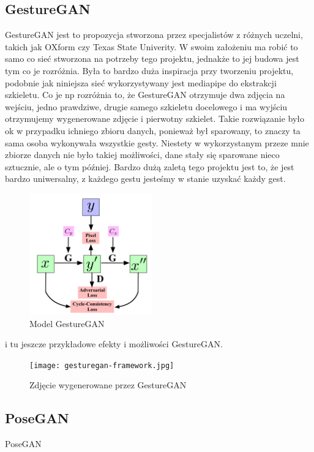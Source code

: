 \documentclass[12pt]{article}
\begin{document}
\begin{sloppypar}
{  \subsection{GestureGAN}
  {
    GestureGAN\cite{gesture-gan} jest to propozycja stworzona przez specjalistów z różnych uczelni, takich jak OXform czy Texas State Univerity.
    W swoim założeniu ma robić to samo co sieć stworzona na potrzeby tego projektu, jednakże to jej budowa jest tym co je rozróżnia.
    Była to bardzo duża inspiracja przy tworzeniu projektu, podobnie jak niniejsza sieć wykorzystywany jest mediapipe do ekstrakcji szkieletu. 
    Co je np rozróżnia to, że GestureGAN otrzymuje dwa zdjęcia na wejściu, jedno prawdziwe, drugie samego szkieletu docelowego i ma wyjściu otrzymujemy wygenerowane zdjęcie i pierwotny szkielet.
    Takie rozwiązanie było ok w przypadku ichniego zbioru danych, ponieważ był sparowany, to znaczy ta sama osoba wykonywała wszystkie gesty. 
    Niestety w wykorzystanym przeze mnie zbiorze danych nie było takiej możliwości, dane stały się sparowane nieco sztucznie, ale o tym później.
    Bardzo dużą zaletą tego projektu jest to, że jest bardzo uniwersalny, z każdego gestu jesteśmy w stanie uzyskać każdy gest.
    \begin{figure}[H]
      \centering
      \includegraphics{gesture-gan.png}
      \caption{Model GestureGAN \cite{gesture-gan}}
      \label{fig:gesture-gan-budowa}
    \end{figure}
    i tu jeszcze przykładowe efekty i możliwości GestureGAN\cite{gesture-gan}.
    \begin{figure}[H]
      \centering
      \texttt{[image: gesturegan-framework.jpg]}
      \caption{Zdjęcie wygenerowane przez GestureGAN \cite{gesture-gan}}
      \label{fig:gesture-gan-budowa}
    \end{figure}
  }
  \subsection{PoseGAN}
  {
    PoseGAN
  }
}


\end{sloppypar}
\end{document}
